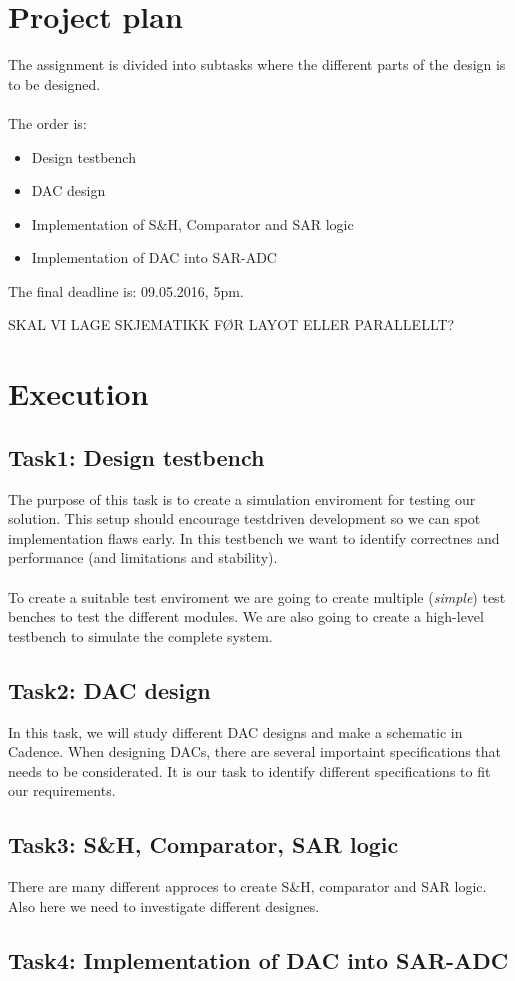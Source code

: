 \documentclass[english, 12pt, a4paper]{article}
\begin{document}
\section*{Project plan}
The assignment is divided into subtasks where the different parts of the design is to be designed.\\
\\
The order is: 
\begin{itemize}
 \item Design testbench
 \item DAC design
 \item Implementation of S\&H, Comparator and SAR logic
 \item Implementation of DAC into SAR-ADC
\end{itemize}
The final deadline is: 09.05.2016, 5pm.

SKAL VI LAGE SKJEMATIKK FØR LAYOT ELLER PARALLELLT?

\section*{Execution}

\subsection*{Task1: Design testbench}
The purpose of this task is to create a simulation enviroment for testing our solution. This setup should encourage testdriven development so we can spot implementation flaws early.
In this testbench we want to identify correctnes and performance (and limitations and stability).\\
\\
To create a suitable test enviroment we are going to create multiple (\textit{simple}) test benches to test the different modules.
We are also going to create a high-level testbench to simulate the complete system.

\subsection*{Task2: DAC design}
In this task, we will study different DAC designs and make a schematic in Cadence. When designing DACs, there are several importaint specifications that needs to be considerated. It is
our task to identify different specifications to fit our requirements.

\subsection*{Task3: S\&H, Comparator, SAR logic}
There are many different approces to create S\&H, comparator and SAR logic. Also here we need to investigate different designes.


\subsection*{Task4: Implementation of DAC into SAR-ADC}
\end{document}
